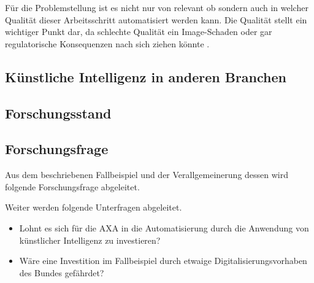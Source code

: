 \documentclass[12pt, twoside, table]{extarticle}
\begin{document}
Für die Problemstellung ist es nicht nur von relevant ob sondern auch in welcher Qualität dieser Arbeitsschritt automatisiert werden kann. Die Qualität stellt ein wichtiger Punkt dar, da schlechte Qualität ein Image-Schaden oder gar regulatorische Konsequenzen nach sich ziehen könnte .

\subsection{Künstliche Intelligenz in anderen Branchen}


\subsection{Forschungsstand}


\subsection{Forschungsfrage}

Aus dem beschriebenen Fallbeispiel und der Verallgemeinerung dessen wird folgende Forschungsfrage abgeleitet.

{
    \medskip
    \setlength{\fboxsep}{1em}
    \noindent{}
    \medskip
}

Weiter werden folgende Unterfragen abgeleitet.


\begin{itemize}
    \item Lohnt es sich für die AXA in die Automatisierung durch die Anwendung von künstlicher Intelligenz zu investieren? 
    \item Wäre eine Investition im Fallbeispiel durch etwaige Digitalisierungsvorhaben des Bundes gefährdet? 
\end{itemize}
\end{document}
